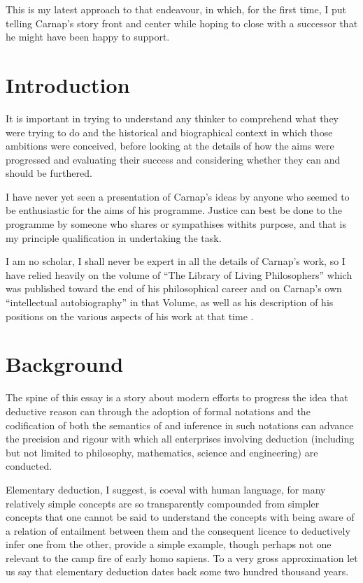 \documentclass[10pt,titlepage]{book}
\begin{document}
This is my latest approach to that endeavour, in which, for the first time, I put telling Carnap's story front and center while hoping to close with a successor that he might have been happy to support.

\section{Introduction}

It is important in trying to understand any thinker to comprehend what they were trying to do and the historical and biographical context in which those ambitions were conceived, before looking at the details of how the aims were progressed and evaluating their success and considering whether they can and should be furthered.

I have never yet seen a presentation of Carnap's ideas by anyone who seemed to be enthusiastic for the aims of his programme.
Justice can best be done to the programme by someone who shares or sympathises withits purpose, and that is my principle qualification in undertaking the task.

I am no scholar, I shall never be expert in all the details of Carnap's work, so I have relied heavily on the volume of ``The Library of Living Philosophers'' which was published toward the end of his philosophical career and on Carnap's own ``intellectual autobiography'' in that Volume, as well as his description of his positions on the various aspects of his work at that time \cite{carnap63a,carnap63}.


\section{Background}

The spine of this essay is a story about modern efforts to progress the idea that deductive reason can  through the adoption of formal notations and the codification of both the semantics of and inference in such notations can advance the precision and rigour with which all enterprises involving deduction (including but not limited to philosophy, mathematics, science and engineering) are conducted.

Elementary deduction, I suggest, is coeval with human language, for many relatively simple concepts are so transparently compounded from simpler concepts that one cannot be said to understand the concepts with being aware of a relation of entailment between them and the consequent licence to deductively infer one from the other, provide a simple example, though perhaps not one relevant to the camp fire of early homo sapiens.
To a very gross approximation let us say that elementary deduction dates back some two hundred thousand years.
\end{document}
